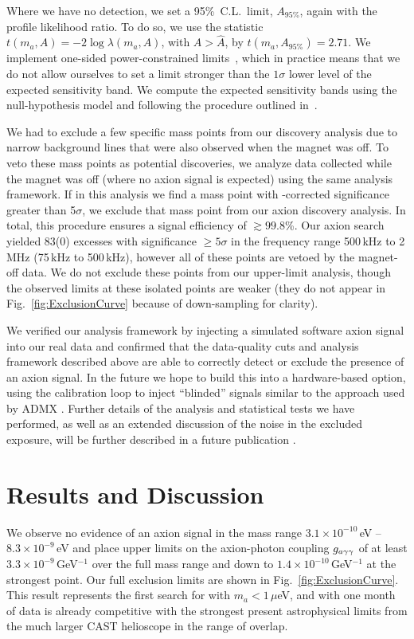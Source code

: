 \documentclass[aps,prl,amsmath,amssymb,reprint,superscriptaddress, nofootinbib,
]{revtex4-1}
\begin{document}
Where we have no detection, we set a 95\%~C.L.\ limit, $A_{95\%}$, again with the profile likelihood ratio. To do so, we use the statistic $t(m_a,A) = -2 \log \lambda(m_a,A)$, with $A > \hat A$, by $t(m_a,A_{95\%}) = 2.71$.  We implement one-sided power-constrained limits~\cite{Cowan:2011an}, which in practice means that we do not allow ourselves to set a limit stronger than the $1\sigma$ lower level of the expected sensitivity band. We compute the expected sensitivity bands using the null-hypothesis model and following the procedure outlined in~\cite{Foster2018}.


We had to exclude a few specific mass points from our discovery analysis due to narrow background lines that were also observed when the magnet was off. To veto these mass points as potential discoveries, we analyze data collected while the magnet was off (where no axion signal is expected) using the same analysis framework.  If in this analysis we find a mass point with {\LEE}-corrected significance greater than 5$\sigma$, we exclude that mass point from our axion discovery analysis. In total, this procedure ensures a signal efficiency of $\gtrsim99.8$\%. Our axion search yielded 83(0) excesses with significance $\geq5\sigma$ in the frequency range 500\,kHz to 2\,MHz (75\,kHz to 500\,kHz), however all of these points are vetoed by the magnet-off data. We do not exclude these points from our upper-limit analysis, though the observed limits at these isolated points are weaker (they do not appear in Fig.~\ref{fig:ExclusionCurve} because of down-sampling for clarity).


We verified our analysis framework by injecting a simulated software axion signal into our real data and confirmed that the data-quality cuts and analysis framework described above are able to correctly detect or exclude the presence of an axion signal. In the future we hope to build this into a hardware-based option, using the calibration loop to inject ``blinded'' signals similar to the approach used by ADMX \cite{ADMX2018}. Further details of the analysis and statistical tests we have performed, as well as an extended discussion of the noise in the excluded exposure, will be further described in a future publication \cite{ABRA_10cm_Technical}.
 
\section{Results and Discussion}


We observe no evidence of an axion signal in the mass range $3.1\times10^{-10}$\,eV -- $8.3\times10^{-9}$\,eV and place upper limits on the axion-photon coupling $g_{a\gamma\gamma}$ of at least \mbox{$3.3\times10^{-9}$\,GeV$^{-1}$} over the full mass range and down to \mbox{$1.4\times10^{-10}$\,GeV$^{-1}$} at the strongest point. Our full exclusion limits are shown in Fig.~\ref{fig:ExclusionCurve}. This result represents the first search for \ADM with $m_a<1\,\mu$eV, and with one month of data is already competitive with the strongest present astrophysical limits from the much larger CAST helioscope \cite{CAST2017} in the range of overlap. 
\end{document}
